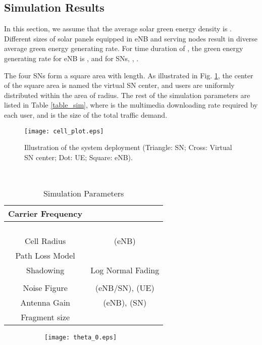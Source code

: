 \documentclass[journal,12pt,onecolumn]{IEEEtran}
\begin{document}
\begin{titlepage}
\begin{center}
\section{Simulation Results}
In this section, we assume that the average solar green energy density is  . Different sizes of solar panels equipped in eNB and serving nodes result in diverse average green energy generating rate. For time duration of  , the green energy generating rate for eNB is  , and for SNs,  , . 




The four SNs form a square area with   length. As illustrated in Fig. \ref{SCENARIO_PLOT}, the center of the square area is named the virtual SN center, and users are uniformly distributed within the area of   radius. The rest of the simulation parameters are listed in Table \ref{table_sim}, where  is the multimedia downloading rate required by each user, and  is the size of the total traffic demand.

\begin{figure}[t]
\centering
\texttt{[image: cell\_plot.eps]}\caption{Illustration of the system deployment (Triangle: SN; Cross: Virtual SN center; Dot: UE; Square: eNB).}
\label{SCENARIO_PLOT}
\end{figure}



\begin{table}[ht]
\caption{Simulation Parameters}\label{table_sim} \centering\  \begin{tabular}{|c|c|}
\hline
Carrier Frequency&  \\
\hline
 & \\
\hline
&\\
\hline
&\\\hline
&\\
\hline
Cell Radius&   (eNB)\\
\hline
Path Loss Model& \\
\hline
Shadowing &   Log Normal Fading\\
\hline
 &  \\
\hline
Noise Figure &  (eNB/SN),   (UE)\\
\hline
Antenna Gain &   (eNB),   (SN)\\
\hline 
Fragment size& \\
\hline
\end{tabular}
\label{tab_2}
\end{table}




\begin{figure}
\vspace{-1em}
\centering   
                \begin{subfigure}[!t]{3 in}
                \texttt{[image: theta\_0.eps]}\caption{}
\end{subfigure}
        ~
        

\end{figure}
\end{center}
\end{titlepage}
\end{document}
